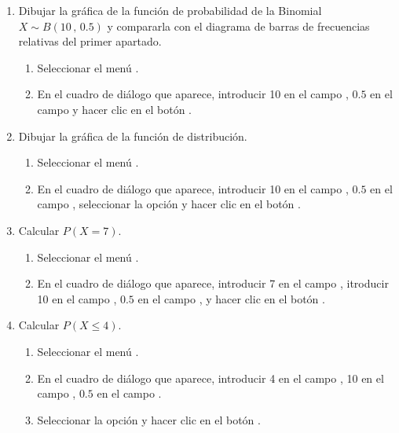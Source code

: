 \begin{enumerate}[leftmargin=*]
\begin{enumerate}
\item Dibujar la gráfica de la función de probabilidad de la Binomial $X\sim B(10\,,\,0.5)$ y compararla con el
diagrama de barras de frecuencias relativas del primer apartado.
\begin{indicacion}{
\begin{enumerate}
\item Seleccionar el menú .
\item En el cuadro de diálogo que aparece, introducir 10 en el campo ,
$0.5$ en el campo  y hacer clic en el botón .
\end{enumerate}}
\end{indicacion}

\item Dibujar la gráfica de la función de distribución.
\begin{indicacion}{
\begin{enumerate}
\item Seleccionar el menú .
\item En el cuadro de diálogo que aparece, introducir 10 en el campo , $0.5$ en el campo
, seleccionar la opción  y hacer clic en el botón
.
\end{enumerate}}
\end{indicacion}

\item Calcular $P(X=7)$.
\begin{indicacion}{
\begin{enumerate}
\item Seleccionar el menú .
\item En el cuadro de diálogo que aparece, introducir 7 en el campo ,
itroducir 10 en el campo , $0.5$ en el campo , y hacer clic
en el botón .
\end{enumerate}}
\end{indicacion}

\item Calcular $P(X\leq 4)$.
\begin{indicacion}{
\begin{enumerate}
\item Seleccionar el menú .
\item En el cuadro de diálogo que aparece, introducir 4 en el campo , 10 en el campo
, $0.5$ en el campo .
\item Seleccionar la opción  y hacer clic en el botón .
\end{enumerate}}
\end{indicacion}


\end{enumerate}
\end{enumerate}
